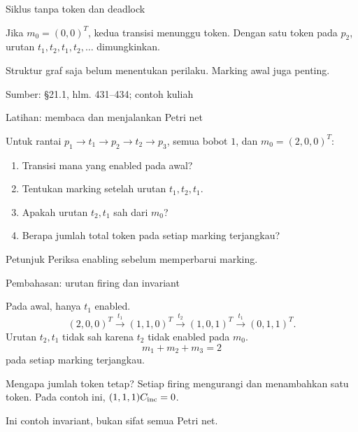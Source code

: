 \documentclass[aspectratio=169,11pt]{beamer}
\newcommand{\source}[1]{%
    \vfill
    \hfill{\tiny\color{gray}Sumber: #1}
}
\begin{document}
\begin{frame}{Siklus tanpa token dan deadlock}

\begin{center}\end{center}
Jika $m_0=(0,0)^T$, kedua transisi menunggu token.
Dengan satu token pada $p_2$, urutan $t_1,t_2,t_1,t_2,\ldots$ dimungkinkan.
\medskip

Struktur graf saja belum menentukan perilaku. Marking awal juga penting.

\source{\S21.1, hlm. 431--434; contoh kuliah}
\end{frame}
\begin{frame}{Latihan: membaca dan menjalankan Petri net}

Untuk rantai $p_1\to t_1\to p_2\to t_2\to p_3$,
semua bobot $1$, dan $m_0=(2,0,0)^T$:
\begin{enumerate}
\item Transisi mana yang enabled pada awal?
\item Tentukan marking setelah urutan $t_1,t_2,t_1$.
\item Apakah urutan $t_2,t_1$ sah dari $m_0$?
\item Berapa jumlah total token pada setiap marking terjangkau?
\end{enumerate}
\begin{block}{Petunjuk}
Periksa enabling sebelum memperbarui marking.
\end{block}

\end{frame}
\begin{frame}{Pembahasan: urutan firing dan invariant}

Pada awal, hanya $t_1$ enabled.
\[
(2,0,0)^T\xrightarrow{t_1}(1,1,0)^T
\xrightarrow{t_2}(1,0,1)^T
\xrightarrow{t_1}(0,1,1)^T.
\]
Urutan $t_2,t_1$ tidak sah karena $t_2$ tidak enabled pada $m_0$.
\[
m_1+m_2+m_3=2
\]
pada setiap marking terjangkau.
\begin{block}{Mengapa jumlah token tetap?}
Setiap firing mengurangi dan menambahkan satu token.
Pada contoh ini, $(1,1,1)C_{\rm inc}=0$.
\end{block}
Ini contoh invariant, bukan sifat semua Petri net.

\end{frame}
\end{document}
